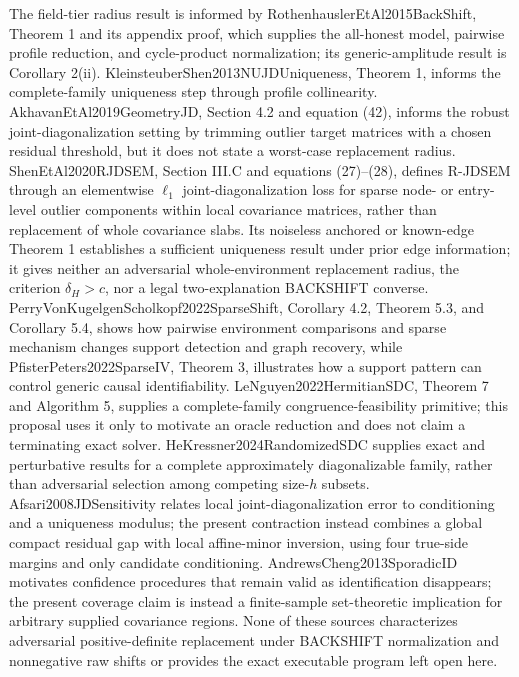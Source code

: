 The field-tier radius result is informed by RothenhauslerEtAl2015BackShift, Theorem 1 and its appendix proof, which supplies the all-honest model, pairwise profile reduction, and cycle-product normalization; its generic-amplitude result is Corollary 2(ii). KleinsteuberShen2013NUJDUniqueness, Theorem 1, informs the complete-family uniqueness step through profile collinearity. AkhavanEtAl2019GeometryJD, Section 4.2 and equation (42), informs the robust joint-diagonalization setting by trimming outlier target matrices with a chosen residual threshold, but it does not state a worst-case replacement radius. ShenEtAl2020RJDSEM, Section III.C and equations (27)--(28), defines R-JDSEM through an elementwise \(\ell_1\) joint-diagonalization loss for sparse node- or entry-level outlier components within local covariance matrices, rather than replacement of whole covariance slabs. Its noiseless anchored or known-edge Theorem 1 establishes a sufficient uniqueness result under prior edge information; it gives neither an adversarial whole-environment replacement radius, the criterion \(\delta_H>c\), nor a legal two-explanation BACKSHIFT converse. PerryVonKugelgenScholkopf2022SparseShift, Corollary 4.2, Theorem 5.3, and Corollary 5.4, shows how pairwise environment comparisons and sparse mechanism changes support detection and graph recovery, while PfisterPeters2022SparseIV, Theorem 3, illustrates how a support pattern can control generic causal identifiability. LeNguyen2022HermitianSDC, Theorem 7 and Algorithm 5, supplies a complete-family congruence-feasibility primitive; this proposal uses it only to motivate an oracle reduction and does not claim a terminating exact solver. HeKressner2024RandomizedSDC supplies exact and perturbative results for a complete approximately diagonalizable family, rather than adversarial selection among competing size-\(h\) subsets. Afsari2008JDSensitivity relates local joint-diagonalization error to conditioning and a uniqueness modulus; the present contraction instead combines a global compact residual gap with local affine-minor inversion, using four true-side margins and only candidate conditioning. AndrewsCheng2013SporadicID motivates confidence procedures that remain valid as identification disappears; the present coverage claim is instead a finite-sample set-theoretic implication for arbitrary supplied covariance regions. None of these sources characterizes adversarial positive-definite replacement under BACKSHIFT normalization and nonnegative raw shifts or provides the exact executable program left open here.